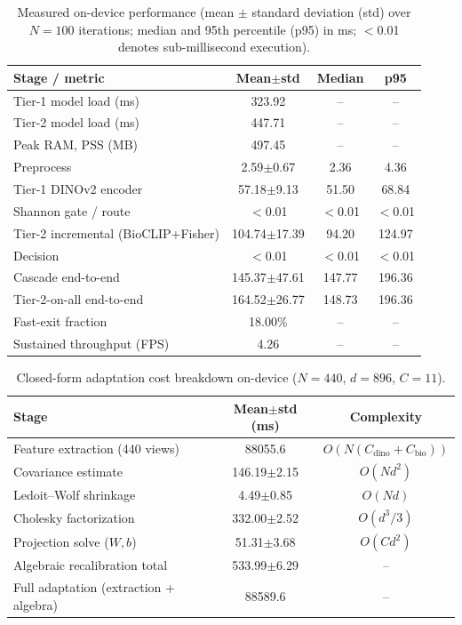 \begin{table}[htbp]
\caption{Measured on-device performance (mean $\pm$ standard deviation (std) over $N=100$ iterations; median and 95th percentile (p95) in ms; $<$0.01 denotes sub-millisecond execution).}
\label{tab:device_perf}
\centering

\footnotesize
\begin{tabular}{lccc}
\toprule
Stage / metric & Mean$\pm$std & Median & p95 \\
\midrule
Tier-1 model load (ms) & 323.92 & -- & -- \\
Tier-2 model load (ms) & 447.71 & -- & -- \\
Peak RAM, PSS (MB) & 497.45 & -- & -- \\
\midrule
Preprocess & 2.59$\pm$0.67 & 2.36 & 4.36 \\
Tier-1 DINOv2 encoder & 57.18$\pm$9.13 & 51.50 & 68.84 \\
Shannon gate / route & $<$0.01 & $<$0.01 & $<$0.01 \\
Tier-2 incremental (BioCLIP+Fisher) & 104.74$\pm$17.39 & 94.20 & 124.97 \\
Decision & $<$0.01 & $<$0.01 & $<$0.01 \\
Cascade end-to-end & 145.37$\pm$47.61 & 147.77 & 196.36 \\
Tier-2-on-all end-to-end & 164.52$\pm$26.77 & 148.73 & 196.36 \\
\midrule
Fast-exit fraction & 18.00\% & -- & -- \\
Sustained throughput (FPS) & 4.26 & -- & -- \\
\bottomrule
\end{tabular}
\end{table}

\begin{table}[htbp]
\caption{Closed-form adaptation cost breakdown on-device ($N=440$, $d=896$, $C=11$).}
\label{tab:adaptation_breakdown}
\centering

\footnotesize
\begin{tabular}{lcc}
\toprule
Stage & Mean$\pm$std (ms) & Complexity \\
\midrule
Feature extraction (440 views) & 88055.6 & $O(N(C_{\text{dino}}+C_{\text{bio}}))$ \\
Covariance estimate & 146.19$\pm$2.15 & $O(Nd^2)$ \\
Ledoit--Wolf shrinkage & 4.49$\pm$0.85 & $O(Nd)$ \\
Cholesky factorization & 332.00$\pm$2.52 & $O(d^3/3)$ \\
Projection solve ($W,b$) & 51.31$\pm$3.68 & $O(Cd^2)$ \\
\midrule
Algebraic recalibration total & 533.99$\pm$6.29 & -- \\
Full adaptation (extraction + algebra) & 88589.6 & -- \\
\bottomrule
\end{tabular}
\end{table}

